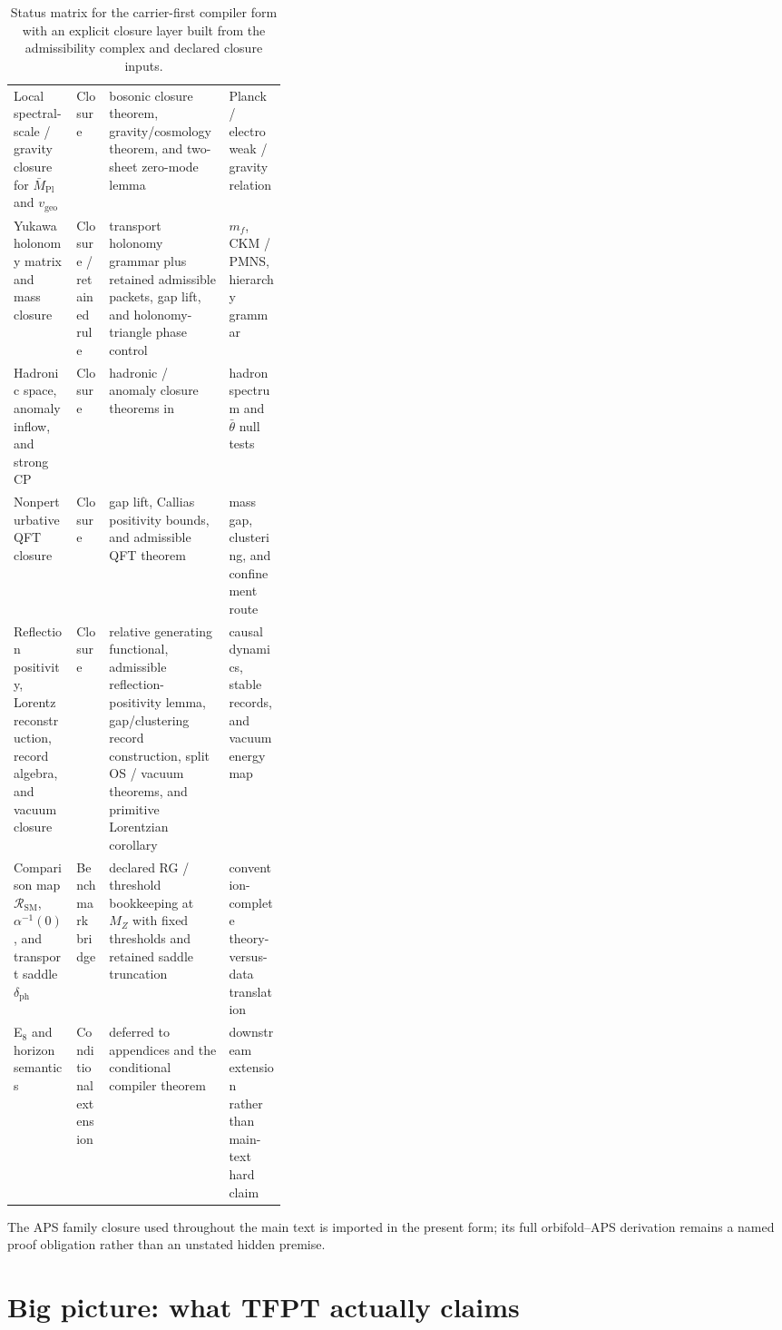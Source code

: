 \documentclass[11pt,a4paper]{article}
\theoremstyle{definition}
\theoremstyle{remark}
\newcommand{\Mpl}{\bar M_{\mathrm{Pl}}}
\newcommand{\SM}{\mathrm{SM}}
\newcommand{\vgeo}{v_{\mathrm{geo}}}
\begin{document}
\begin{table}[t]
\begin{tabularx}{\linewidth}{@{}>{\raggedright\arraybackslash}p{0.23\linewidth}>{\raggedright\arraybackslash}p{0.12\linewidth}YY@{}}
Local spectral-scale / gravity closure for $\Mpl$ and $\vgeo$ & Closure & bosonic closure theorem, gravity/cosmology theorem, and two-sheet zero-mode lemma & Planck / electroweak / gravity relation \\
Yukawa holonomy matrix and mass closure & Closure / retained rule & transport holonomy grammar plus retained admissible packets, gap lift, and holonomy-triangle phase control & $m_f$, CKM / PMNS, hierarchy grammar \\
Hadronic space, anomaly inflow, and strong CP & Closure & hadronic / anomaly closure theorems in  & hadron spectrum and $\bar\theta$ null tests \\
Nonperturbative QFT closure & Closure & gap lift, Callias positivity bounds, and admissible QFT theorem & mass gap, clustering, and confinement route \\
Reflection positivity, Lorentz reconstruction, record algebra, and vacuum closure & Closure & relative generating functional, admissible reflection-positivity lemma, gap/clustering record construction, split OS / vacuum theorems, and primitive Lorentzian corollary & causal dynamics, stable records, and vacuum energy map \\
Comparison map $\mathcal R_{\SM}$, $\alpha^{-1}(0)$, and transport saddle $\delta_{\mathrm{ph}}$ & Benchmark bridge & declared RG / threshold bookkeeping at $M_Z$ with fixed thresholds and retained saddle truncation & convention-complete theory-versus-data translation \\
E$_8$ and horizon semantics & Conditional extension & deferred to appendices and the conditional compiler theorem & downstream extension rather than main-text hard claim \\
\bottomrule
\end{tabularx}
\caption{Status matrix for the carrier-first compiler form with an explicit closure layer built from the admissibility complex and declared closure inputs.}
\label{tab:status-matrix}
\end{table}

The APS family closure used throughout the main text is imported in the present form; its full orbifold--APS derivation remains a named proof obligation rather than an unstated hidden premise.

\section{Big picture: what TFPT actually claims}
\end{document}

